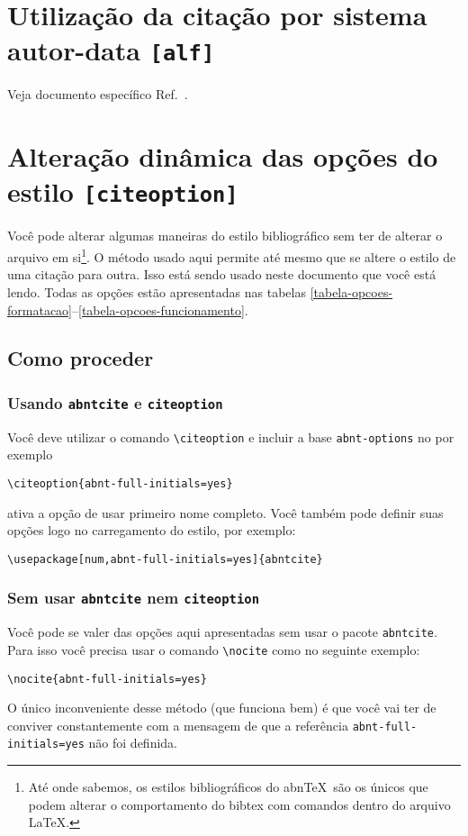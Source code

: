 \documentclass[a4paper]{ltxdoc}
\newcommand{\abnTeX}{abn\TeX}
\begin{document}
\section{Utilização da citação por sistema autor-data {\tt [alf]}}

Veja documento específico Ref.~.

\section{Alteração dinâmica das opções do estilo {\tt [citeoption]}}
\label{chapter-opcoes-estilo}

Você pode alterar algumas maneiras do estilo bibliográfico sem ter de alterar o
arquivo em si\footnote{Até onde sabemos, os estilos bibliográficos do \abnTeX\
são os únicos que podem alterar o comportamento do bibtex com comandos dentro do
arquivo \LaTeX.}. O método usado aqui permite até mesmo que se altere o estilo
de uma citação para outra. Isso está sendo usado neste documento que você está
lendo. Todas as opções estão apresentadas nas tabelas
\ref{tabela-opcoes-formatacao}--\ref{tabela-opcoes-funcionamento}.

\subsection{Como proceder}

\subsubsection{Usando {\tt abntcite} e {\tt citeoption}}

Você deve utilizar o comando \verb+\citeoption+ e
incluir a base {\tt abnt-options} no \verb++
por exemplo
\begin{verbatim}
\citeoption{abnt-full-initials=yes}
\end{verbatim}
ativa a opção de usar primeiro nome completo.
Você também pode definir suas opções logo no carregamento do estilo,
por exemplo:
\begin{verbatim}
\usepackage[num,abnt-full-initials=yes]{abntcite}
\end{verbatim}

\subsubsection{Sem usar {\tt abntcite} nem {\tt citeoption}}

Você pode se valer das opções aqui apresentadas sem usar o pacote {\tt abntcite}.
Para isso você precisa usar o comando \verb+\nocite+ como no seguinte
exemplo:
\begin{verbatim}
\nocite{abnt-full-initials=yes}
\end{verbatim}
O único inconveniente desse método (que funciona bem) é que você vai ter
de conviver constantemente com a mensagem de que a referência {\tt abnt-full-initials=yes}
não foi definida.
\end{document}
